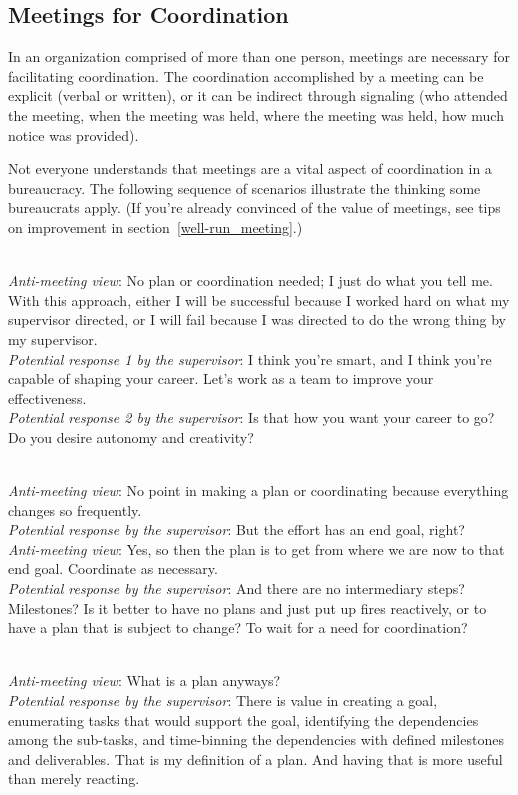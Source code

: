 \subsection{Meetings for Coordination\label{sec:meetings-for-coordination}}
In an organization comprised of more than one person, meetings are necessary for facilitating coordination. The coordination accomplished by a meeting can be explicit (verbal or written), or it can be indirect through signaling (who attended the meeting, when the meeting was held, where the meeting was held, how much notice was provided). 

Not everyone understands that meetings are a vital aspect of coordination in a bureaucracy. The following sequence of scenarios illustrate the thinking some bureaucrats apply. (If you're already convinced of the value of meetings, see tips on improvement in section~\ref{well-run_meeting}.)


\ \\
\textit{Anti-meeting view}: No plan or coordination needed; I just do what you tell me. With this approach, either I will be successful because I worked hard on what my supervisor directed, or I will fail because I was directed to do the wrong thing by my supervisor.\\
\textit{Potential response 1 by the supervisor}: I think you're smart, and I think you're capable of shaping your career. Let's work as a team to improve your effectiveness. \\
\textit{Potential response 2 by the supervisor}: Is that how you want your career to go? Do you desire autonomy and creativity?

\ \\
\textit{Anti-meeting view}: No point in making a plan or coordinating because everything changes so frequently. \\
\textit{Potential response by the supervisor}: But the effort has an end goal, right?\\
\textit{Anti-meeting view}:  Yes, so then the plan is to get from where we are now to that end goal. Coordinate as necessary. \\
\textit{Potential response by the supervisor}: And there are no intermediary steps? Milestones?
Is it better to have no plans and just put up fires reactively, or to have a plan that is subject to change? To wait for a need for coordination?

\ \\
\textit{Anti-meeting view}: What is a plan anyways?\\
\textit{Potential response by the supervisor}: There is value in creating a goal, enumerating tasks that would support the goal, identifying the dependencies among the sub-tasks, and time-binning the dependencies with defined milestones and deliverables. That is my definition of a plan. And having that is more useful than merely reacting.

